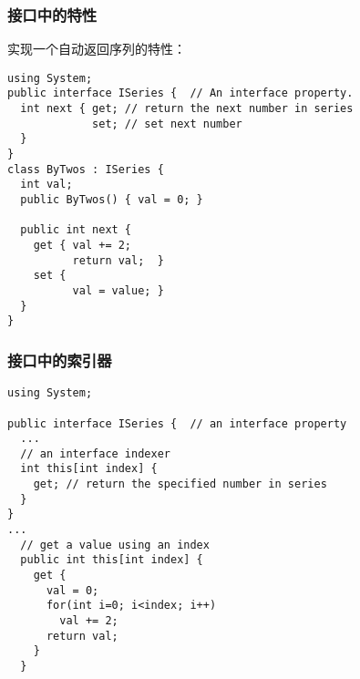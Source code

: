 
\begin{frame}[fragile]
\frametitle{接口中的特性}
实现一个自动返回序列的特性：
\begin{lstlisting}
using System;
public interface ISeries {  // An interface property.
  int next { get; // return the next number in series
             set; // set next number
  }
}
class ByTwos : ISeries {
  int val;
  public ByTwos() { val = 0; }

  public int next {
    get { val += 2;
          return val;  }
    set {
          val = value; }
  }
}

\end{lstlisting}

\end{frame}

\begin{frame}[fragile]
\frametitle{接口中的索引器}
\begin{lstlisting}
using System;

public interface ISeries {  // an interface property
  ...
  // an interface indexer
  int this[int index] {
    get; // return the specified number in series
  }
}
...
  // get a value using an index
  public int this[int index] {
    get {
      val = 0;
      for(int i=0; i<index; i++)
        val += 2;
      return val;
    }
  }

\end{lstlisting}

\end{frame}

